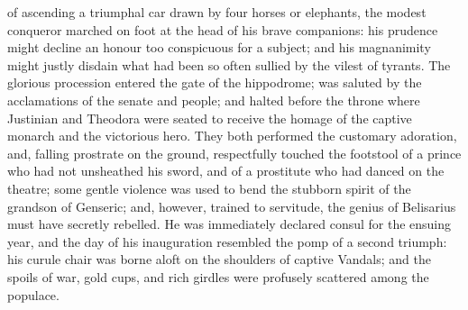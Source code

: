 of ascending a triumphal car drawn by four horses or elephants, the modest conqueror marched on foot at the head of his brave companions: his prudence might decline an honour too conspicuous for a subject; and his magnanimity might justly disdain what had been so often sullied by the vilest of tyrants. The glorious procession entered the gate of the hippodrome; was saluted by the acclamations of the senate and people; and halted before the throne where Justinian and Theodora were seated to receive the homage of the captive monarch and the victorious hero. They both performed the customary adoration, and, falling prostrate on the ground, respectfully touched the footstool of a prince who had not unsheathed his sword, and of a prostitute who had danced on the theatre; some gentle violence was used to bend the stubborn spirit of the grandson of Genseric; and, however, trained to servitude, the genius of Belisarius must have secretly rebelled. He was immediately declared consul for the ensuing year, and the day of his inauguration resembled the pomp of a second triumph: his curule chair was borne aloft on the shoulders of captive Vandals; and the spoils of war, gold cups, and rich girdles were profusely scattered among the populace.

